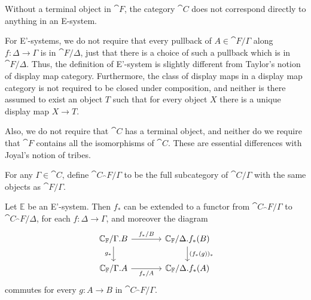 \begin{rmk}
Without a terminal object in $\cat{F}$, the category $\cat{C}$ does not correspond
directly to anything in an E-system.
\end{rmk}

\begin{rmk}
For E'-systems, we do not require that every pullback of $A\in\cat{F}/\Gamma$ along $f:\Delta\to\Gamma$
is in $\cat{F}/\Delta$, just that there is a choice of such a pullback which is
in $\cat{F}/\Delta$. Thus, the definition of E'-system is slightly different from
Taylor's notion of display map category. Furthermore, the class of display maps in
a display map category is not required to be closed under composition, and neither
is there assumed to exist an object $T$ such that for every object $X$ there is a 
unique display map $X\to T$.
\end{rmk}

\begin{rmk}
Also, we do not require that $\cat{C}$ has a terminal object, and neither do
we require that $\cat{F}$ contains all the isomorphisms of $\cat{C}$. These are
essential differences with Joyal's notion of tribes.   
\end{rmk}

\begin{defn}
For any $\Gamma\in\cat{C}$, define $\cat{C}_\cat{F}/\Gamma$ to be the full
subcategory of $\cat{C}/\Gamma$ with the same objects as $\cat{F}/\Gamma$. 
\end{defn}

\begin{lem}\label{lem:pb_selfdistributive}
Let $\mathbb{E}$ be an E'-system. Then $f_\ast$ can be extended to a functor from
$\cat{C}_\cat{F}/\Gamma$ to $\cat{C}_\cat{F}/\Delta$, for each $f:\Delta\to\Gamma$, and moreover the diagram
\begin{equation*}
\begin{tikzcd}[column sep=large]
\cat{C}_\cat{F}/\ctxext{\Gamma}{B} \arrow[r,"{f_\ast/B}"] \arrow[d,swap,"{g_\ast}"]
& \cat{C}_\cat{F}/\ctxext{\Delta}{f_\ast(B)} \arrow[d,"{(f_\ast(g))_\ast}"] \\
\cat{C}_\cat{F}/\ctxext{\Gamma}{A} \arrow[r,swap,"{f_\ast/A}"]
& \cat{C}_\cat{F}/\ctxext{\Delta}{f_\ast(A)}
\end{tikzcd}
\end{equation*}
commutes for every $g:A\to B$ in $\cat{C}_\cat{F}/\Gamma$.
\end{lem}


